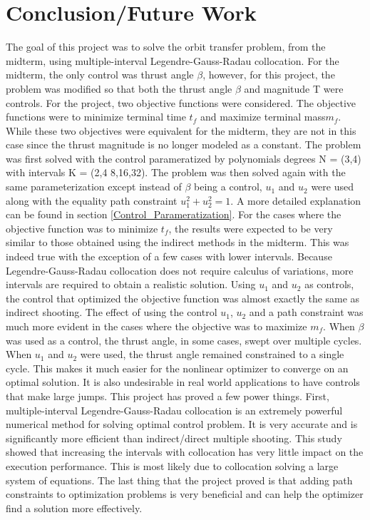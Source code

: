 \documentclass[]{article}
\begin{document}
	\section{Conclusion/Future Work}
	The goal of this project was to solve the orbit transfer problem, from the midterm, using multiple-interval Legendre-Gauss-Radau collocation. For the midterm, the only control was thrust angle \(\beta\), however, for this project, the problem was modified so that both the thrust angle \(\beta\) and magnitude T were controls. For the project, two objective functions were considered. The objective functions were to minimize terminal time \(t_f\) and maximize terminal mass\(m_f\). While these two objectives were equivalent for the midterm, they are not in this case since the thrust magnitude is no longer modeled as a constant. The problem was first solved with the control parameratized by polynomials degrees N = (3,4) with intervals K = (2,4 8,16,32). The problem was then solved again with the same parameterization except instead of \(\beta\) being a control, \(u_1\) and \(u_2\) were used along with the equality path constraint \(u_1^2 + u_2^2 = 1\). A more detailed explanation can be found in section \ref{Control_Parameratization}. For the cases where the objective function was to minimize \(t_f\), the results were expected to be very similar to those obtained using the indirect methods in the midterm. This was indeed true with the exception of a few cases with lower intervals. Because Legendre-Gauss-Radau collocation does not require calculus of variations, more intervals are required to obtain a realistic solution. Using \(u_1\) and \(u_2\) as controls, the control that optimized the objective function was almost exactly the same as indirect shooting. The effect of using the control \(u_1\), \(u_2\) and a path constraint was much more evident in the cases where the objective was to maximize \(m_f\). When \(\beta\) was used as a control, the thrust angle, in some cases, swept over multiple cycles. When \(u_1\) and \(u_2\) were used, the thrust angle remained constrained to a single cycle. This makes it much easier for the nonlinear optimizer to converge on an optimal solution. It is also undesirable in real world applications to have controls that make large jumps. This project has proved a few power things. First, multiple-interval Legendre-Gauss-Radau collocation is an extremely powerful numerical method for solving optimal control problem. It is very accurate and is significantly more efficient than indirect/direct multiple shooting. This study showed that increasing the intervals with collocation has very little impact on the execution performance. This is most likely due to collocation solving a large system of equations. The last thing that the project proved is that adding path constraints to optimization problems is very beneficial and can help the optimizer find a solution more effectively.
\end{document}
